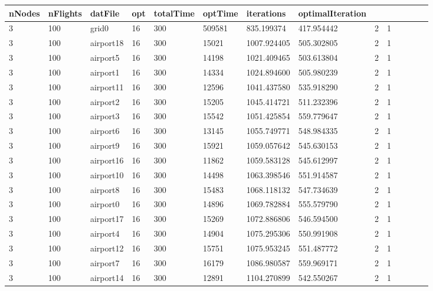 \documentclass[../thesis.tex]{subfiles}
\begin{document}
\begin{table}[!ht]
    \centering
    \begin{tabularx}{\textwidth}{|X|X|X|X|X|X|X|X|X|X|X|X|X|X|}    \hline
        nNodes & nFlights & datFile & opt & totalTime & optTime & iterations & optimalIteration\\ \hline
        3 & 100 & grid0 & 16 & 300 & 509581 & 835.199374 & 417.954442 & 2 & 1 \\ \hline
        3 & 100 & airport18 & 16 & 300 & 15021 & 1007.924405 & 505.302805 & 2 & 1 \\ \hline
        3 & 100 & airport5 & 16 & 300 & 14198 & 1021.409465 & 503.613804 & 2 & 1 \\ \hline
        3 & 100 & airport1 & 16 & 300 & 14334 & 1024.894600 & 505.980239 & 2 & 1 \\ \hline
        3 & 100 & airport11 & 16 & 300 & 12596 & 1041.437580 & 535.918290 & 2 & 1 \\ \hline   
        3 & 100 & airport2 & 16 & 300 & 15205 & 1045.414721 & 511.232396 & 2 & 1 \\ \hline
        3 & 100 & airport3 & 16 & 300 & 15542 & 1051.425854 & 559.779647 & 2 & 1 \\ \hline
        3 & 100 & airport6 & 16 & 300 & 13145 & 1055.749771 & 548.984335 & 2 & 1 \\ \hline
        3 & 100 & airport9 & 16 & 300 & 15921 & 1059.057642 & 545.630153 & 2 & 1 \\ \hline
        3 & 100 & airport16 & 16 & 300 & 11862 & 1059.583128 & 545.612997 & 2 & 1 \\ \hline
        3 & 100 & airport10 & 16 & 300 & 14498 & 1063.398546 & 551.914587 & 2 & 1 \\ \hline
        3 & 100 & airport8 & 16 & 300 & 15483 & 1068.118132 & 547.734639 & 2 & 1 \\ \hline
        3 & 100 & airport0 & 16 & 300 & 14896 & 1069.782884 & 555.579790 & 2 & 1 \\ \hline
        3 & 100 & airport17 & 16 & 300 & 15269 & 1072.886806 & 546.594500 & 2 & 1 \\ \hline
        3 & 100 & airport4 & 16 & 300 & 14904 & 1075.295306 & 550.991908 & 2 & 1 \\ \hline
        3 & 100 & airport12 & 16 & 300 & 15751 & 1075.953245 & 551.487772 & 2 & 1 \\ \hline
        3 & 100 & airport7 & 16 & 300 & 16179 & 1086.980587 & 559.969171 & 2 & 1 \\ \hline
        3 & 100 & airport14 & 16 & 300 & 12891 & 1104.270899 & 542.550267 & 2 & 1 \\ \hline

\end{tabularx}
\end{table}
\end{document}
